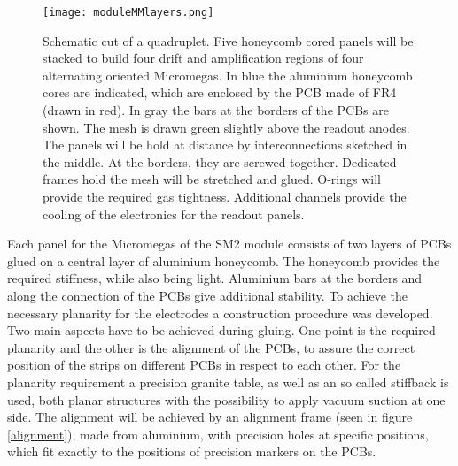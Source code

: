 \documentclass[
a4paper,                                %
twoside,                                %
BCOR1.4cm,                      %
10pt,                           %
headings=normal,                %
headsepline,                    %
clearplainpage, %
final,                                  %
div=14,
parskip=full,
openright,
bibliography=toc
]{scrreprt}
\begin{document}
\begin{figure}[H]
	\centering
	\texttt{[image: moduleMMlayers.png]}
	\caption{Schematic cut of a quadruplet. Five honeycomb cored panels will be stacked to build four drift and amplification regions of four alternating oriented Micromegas. In blue the aluminium honeycomb cores are indicated, which are enclosed by the PCB made of FR4 (drawn in red). In gray the bars at the borders of the PCBs are shown. The mesh is drawn green slightly above the readout anodes. The panels will be hold at distance by interconnections sketched in the middle. At the borders, they are screwed together. Dedicated frames hold the mesh will be stretched and glued. O-rings will provide the required gas tightness. Additional channels provide the cooling of the electronics for the readout panels.}
	\label{quadrupletspanels}
\end{figure}

Each panel for the Micromegas of the SM2 module consists of two layers of PCBs glued on a central layer of aluminium honeycomb. The honeycomb provides the required stiffness, while also being light. Aluminium bars at the borders and along the connection of the PCBs give additional stability. To achieve the necessary planarity for the electrodes a construction procedure was developed. Two main aspects have to be achieved during gluing. One point is the required planarity and the other is the alignment of the PCBs, to assure the correct position of the strips on different PCBs in respect to each other. For the planarity requirement a precision granite table, as well as an so called stiffback is used, both planar structures with the possibility to apply vacuum suction at one side. The alignment will be achieved by an alignment frame (seen in figure \ref{alignment}), made from aluminium, with precision holes at specific positions, which fit exactly to the positions of precision markers on the PCBs.
\end{document}
